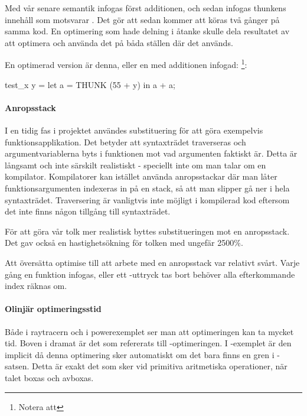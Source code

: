 \documentclass[Rapport]{subfiles}
\begin{document}
Med vår senare semantik infogas först additionen, och sedan infogas thunkens innehåll
som motsvarar . Det gör att  sedan kommer att
köras två gånger på samma kod. En optimering som hade delning i åtanke 
skulle dela resultatet av att optimera  och använda det på båda ställen där det används.

En optimerad version är denna, eller en med additionen infogad:
\footnote{Notera att }:

\begin{codeEx}
test_x y = let
    { a = THUNK (55 + y)
    } in a + a;
\end{codeEx}

\paragraph{Anropsstack}

I en tidig fas i projektet användes substituering för att göra exempelvis funktionsapplikation.
Det betyder att syntaxträdet traverseras och argumentvariablerna byts i funktionen
mot vad argumenten faktiskt är. Detta är långsamt och inte särskilt realistiskt - 
speciellt inte om man talar om en kompilator. Kompilatorer kan istället använda anropsstackar
där man låter funktionsargumenten indexeras in på en stack, så att man slipper
gå ner i hela syntaxträdet. Traversering är vanligtvis inte möjligt i kompilerad kod eftersom
det inte finns någon tillgång till syntaxträdet.

För att göra vår tolk mer realistisk byttes substitueringen mot en anropsstack. 
Det gav också en hastighetsökning för tolken med ungefär 2500\%.


Att översätta optimise till att arbete med en anropsstack var relativt svårt. 
Varje gång en funktion infogas, eller ett -uttryck tas bort behöver alla efterkommande index räknas om. 

\paragraph{Olinjär optimeringsstid}
\label{sec:diskussion_om_exponentialitet} %
Både i raytracern och i powerexemplet ser man att optimeringen kan ta mycket tid.
Boven i dramat är det som refererats till -optimeringen. I
-exemplet är den implicit då denna optimering sker automatiskt
om det bara finns en gren i -satsen. Detta är exakt det som sker 
vid primitiva aritmetiska operationer, när talet boxas och avboxas.
\end{document}

